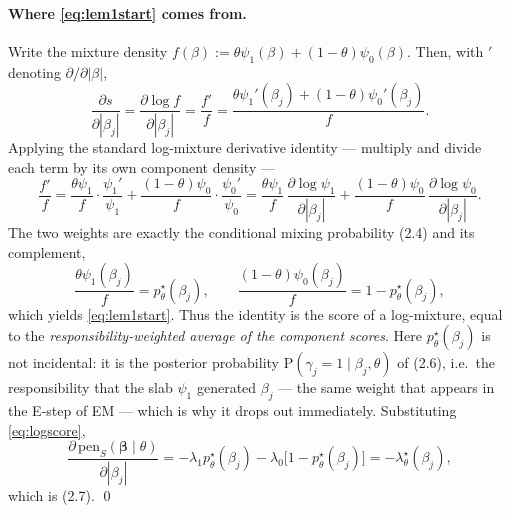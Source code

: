 \documentclass[11pt]{article}
\newcommand{\bbeta}{\bm{\beta}}
\newcommand{\pstar}{p^{\star}}
\newcommand{\lstar}{\lambda^{\star}}
\begin{document}
\paragraph{Where \eqref{eq:lem1start} comes from.}
Write the mixture density $f(\beta) := \theta\psi_1(\beta)+(1-\theta)\psi_0(\beta)$.
Then, with ${}'$ denoting $\partial/\partial|\beta|$,
\begin{equation*}
  \frac{\partial s}{\partial|\beta_j|}
  = \frac{\partial\log f}{\partial|\beta_j|}
  = \frac{f'}{f}
  = \frac{\theta\psi_1'(\beta_j)+(1-\theta)\psi_0'(\beta_j)}{f}.
\end{equation*}
Applying the standard log-mixture derivative identity --- multiply and divide
each term by its own component density ---
\begin{equation*}
  \frac{f'}{f}
  = \frac{\theta\psi_1}{f}\cdot\frac{\psi_1'}{\psi_1}
  + \frac{(1-\theta)\psi_0}{f}\cdot\frac{\psi_0'}{\psi_0}
  = \frac{\theta\psi_1}{f}\,\frac{\partial\log\psi_1}{\partial|\beta_j|}
  + \frac{(1-\theta)\psi_0}{f}\,\frac{\partial\log\psi_0}{\partial|\beta_j|}.
\end{equation*}
The two weights are exactly the conditional mixing probability (2.4) and its
complement,
\begin{equation}\label{eq:responsibility}
  \frac{\theta\psi_1(\beta_j)}{f} = \pstar_\theta(\beta_j),
  \qquad
  \frac{(1-\theta)\psi_0(\beta_j)}{f} = 1-\pstar_\theta(\beta_j),
\end{equation}
which yields \eqref{eq:lem1start}. Thus the identity is the score of a
log-mixture, equal to the \emph{responsibility-weighted average of the component
scores}. Here $\pstar_\theta(\beta_j)$ is not incidental: it is the posterior
probability $\mathrm{P}(\gamma_j=1\mid\beta_j,\theta)$ of (2.6), i.e.\ the
responsibility that the slab $\psi_1$ generated $\beta_j$ --- the same weight
that appears in the E-step of EM --- which is why it drops out immediately.
Substituting \eqref{eq:logscore},
\begin{equation*}
  \frac{\partial\,\mathrm{pen}_S(\bbeta\mid\theta)}{\partial|\beta_j|}
  = -\lambda_1\pstar_\theta(\beta_j) - \lambda_0\bigl[1-\pstar_\theta(\beta_j)\bigr]
  = -\lstar_\theta(\beta_j),
\end{equation*}
which is (2.7). \qed
\end{document}
